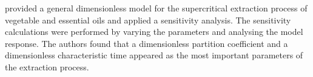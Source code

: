 \documentclass[../Article_Sensitivity_Analsysis.tex]{subfiles}
\begin{document}
	\citet{Poletto1996} provided a general dimensionless model for the supercritical extraction process of vegetable and essential oils and applied a sensitivity analysis. The sensitivity calculations were performed by varying the parameters and analysing the model response. The authors found that a dimensionless partition coefficient and a dimensionless characteristic time appeared as the most important parameters of the extraction process. 
	
\end{document}
